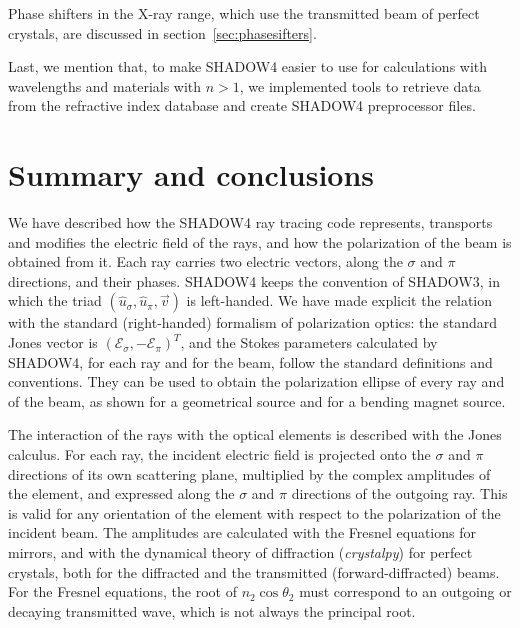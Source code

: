 \documentclass{iucr}
\begin{document}
Phase shifters in the X-ray range, which use the transmitted beam of perfect crystals, are discussed in section~\ref{sec:phasesifters}.



Last, we mention that, to make SHADOW4 easier to use for calculations with wavelengths and materials with $n>1$, we implemented tools to retrieve data from the refractive index database \cite{RefractiveIndexDatabase2024} and create SHADOW4 preprocessor files. 

\section{Summary and conclusions}
\label{sec:summary}

We have described how the SHADOW4 ray tracing code represents, transports and modifies the electric field of the rays, and how the polarization of the beam is obtained from it. Each ray carries two electric vectors, along the $\sigma$ and $\pi$ directions, and their phases. SHADOW4 keeps the convention of SHADOW3, in which the triad $(\hat{u}_\sigma,\hat{u}_\pi,\vec{v})$ is left-handed. We have made explicit the relation with the standard (right-handed) formalism of polarization optics: the standard Jones vector is $(\mathcal{E}_\sigma,-\mathcal{E}_\pi)^T$, and the Stokes parameters calculated by SHADOW4, for each ray and for the beam, follow the standard definitions and conventions. They can be used to obtain the polarization ellipse of every ray and of the beam, as shown for a geometrical source and for a bending magnet source.

The interaction of the rays with the optical elements is described with the Jones calculus. For each ray, the incident electric field is projected onto the $\sigma$ and $\pi$ directions of its own scattering plane, multiplied by the complex amplitudes of the element, and expressed along the $\sigma$ and $\pi$ directions of the outgoing ray. This is valid for any orientation of the element with respect to the polarization of the incident beam. The amplitudes are calculated with the Fresnel equations for mirrors, and with the dynamical theory of diffraction ({\it crystalpy}) for perfect crystals, both for the diffracted and the transmitted (forward-diffracted) beams. For the Fresnel equations, the root of $n_2\cos\theta_2$ must correspond to an outgoing or decaying transmitted wave, which is not always the principal root.
\end{document}

